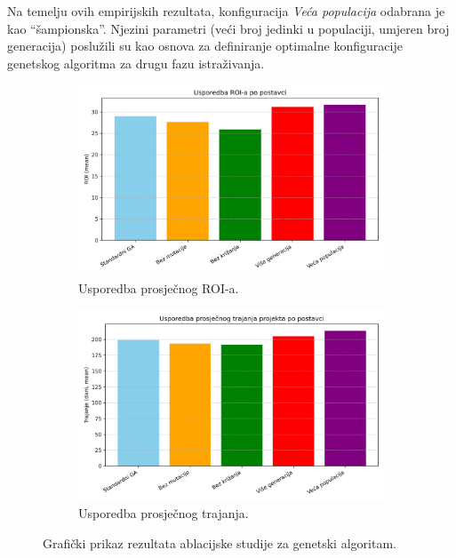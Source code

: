 Na temelju ovih empirijskih rezultata, konfiguracija \emph{Veća populacija} odabrana je kao ``šampionska''. Njezini parametri (veći broj jedinki u populaciji, umjeren broj generacija) poslužili su kao osnova za definiranje optimalne konfiguracije genetskog algoritma za drugu fazu istraživanja.

\begin{figure}[H]
    \centering
    \begin{subfigure}[b]{0.48\textwidth}
        \centering
        \includegraphics[width=\textwidth]{slike/ga_usporedba_roi.png}
        \caption{Usporedba prosječnog ROI-a.}
        \label{fig:ga_roi}
    \end{subfigure}
    \hfill
    \begin{subfigure}[b]{0.48\textwidth}
        \centering
        \includegraphics[width=\textwidth]{slike/ga_usporedba_trajanje.png}
        \caption{Usporedba prosječnog trajanja.}
        \label{fig:ga_trajanje}
    \end{subfigure}
    \caption{Grafički prikaz rezultata ablacijske studije za genetski algoritam.}
    \label{fig:ga_ablation}
\end{figure}

